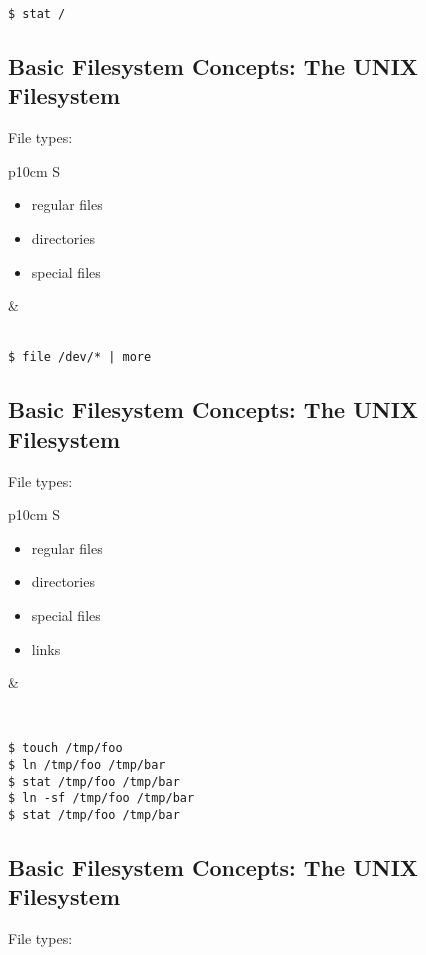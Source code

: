 \documentclass[xga]{xdvislides}
\begin{document}
\verb+$ stat /+

\subsection{Basic Filesystem Concepts: The UNIX Filesystem}
File types:
\\

\begin{tabular}{ p{10cm} S }
\begin{itemize}
	\item regular files
	\item directories
	\item special files
\end{itemize}
&  \\
\end{tabular}
\\

\verb+$ file /dev/* | more+

\subsection{Basic Filesystem Concepts: The UNIX Filesystem}
File types:
\\

\begin{tabular}{ p{10cm} S }
\begin{itemize}
	\item regular files
	\item directories
	\item special files
	\item links
\end{itemize}
&  \\
\end{tabular}
\\

\begin{verbatim}
$ touch /tmp/foo
$ ln /tmp/foo /tmp/bar
$ stat /tmp/foo /tmp/bar
$ ln -sf /tmp/foo /tmp/bar
$ stat /tmp/foo /tmp/bar
\end{verbatim}

\subsection{Basic Filesystem Concepts: The UNIX Filesystem}
File types:
\\
\end{document}
